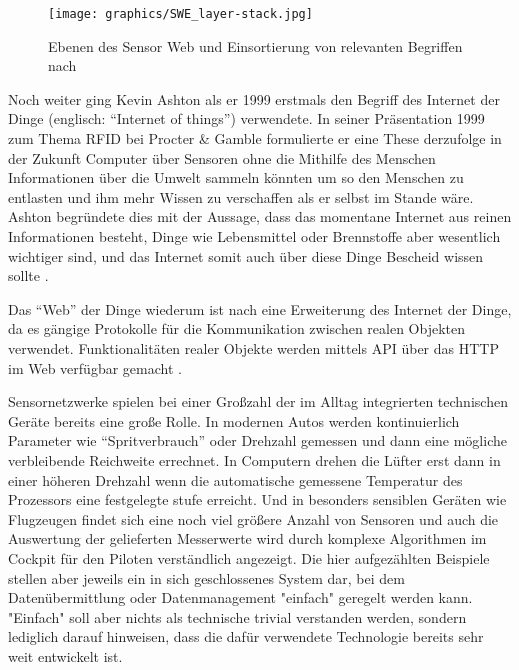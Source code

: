 \begin{figure}[H]
	\centering
 	 \texttt{[image: graphics/SWE\_layer-stack.jpg]} 
	\caption{Ebenen des Sensor Web und Einsortierung von relevanten Begriffen nach \citep{broring_new_2011}}
	 \label{fig:swe_layer-stack}
\end{figure}

Noch weiter ging Kevin Ashton als er 1999 erstmals den Begriff des Internet der Dinge (englisch: ``Internet of things'') verwendete. In seiner Präsentation 1999 zum Thema  \gls{RFID} bei Procter \& Gamble formulierte er eine These derzufolge in der Zukunft Computer über Sensoren ohne die Mithilfe des Menschen Informationen über die Umwelt sammeln könnten um so den Menschen zu entlasten und ihm mehr Wissen zu verschaffen als er selbst im Stande wäre. Ashton begründete dies mit der Aussage, dass das momentane Internet aus reinen Informationen besteht, Dinge wie Lebensmittel oder Brennstoffe aber wesentlich wichtiger sind, und das Internet somit auch über diese Dinge Bescheid wissen sollte \citep{ashton_that_2009}.

Das ``Web'' der Dinge wiederum ist nach \citep{broring_new_2011} eine Erweiterung des Internet der Dinge, da es gängige Protokolle für die Kommunikation zwischen realen Objekten verwendet. Funktionalitäten realer Objekte werden mittels \gls{API} über das \gls{HTTP} im Web verfügbar gemacht \citep{guinard_towards_2009}.

Sensornetzwerke spielen bei einer Großzahl der im Alltag integrierten technischen Geräte bereits eine große Rolle. In modernen Autos werden kontinuierlich Parameter wie ``Spritverbrauch'' oder Drehzahl gemessen und dann eine mögliche verbleibende Reichweite errechnet. In Computern drehen die Lüfter erst dann in einer höheren Drehzahl wenn die automatische gemessene Temperatur des Prozessors eine festgelegte stufe erreicht. Und in besonders sensiblen Geräten wie Flugzeugen findet sich eine noch viel größere Anzahl von Sensoren und auch die Auswertung der gelieferten Messerwerte wird durch komplexe Algorithmen im Cockpit für den Piloten verständlich angezeigt. Die hier aufgezählten Beispiele stellen aber jeweils ein in sich geschlossenes System dar, bei dem Datenübermittlung oder Datenmanagement "einfach" geregelt werden kann. "Einfach" soll aber nichts als technische trivial verstanden werden, sondern lediglich darauf hinweisen, dass die dafür verwendete Technologie bereits sehr weit entwickelt ist. 

